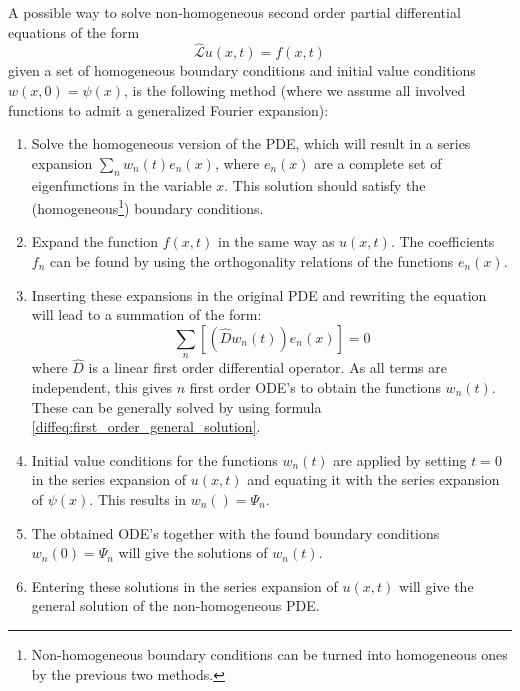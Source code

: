     \begin{method}
        A possible way to solve non-homogeneous second order partial differential equations of the form \[\hat{\mathcal{L}}u(x, t) = f(x, t)\] given a set of homogeneous boundary conditions and initial value conditions $w(x, 0) = \psi(x)$, is the following method (where we assume all involved functions to admit a generalized Fourier expansion):
        \begin{enumerate}
            \item Solve the homogeneous version of the PDE, which will result in a series expansion $\sum_nw_n(t)e_n(x)$, where $e_n(x)$ are a complete set of eigenfunctions in the variable $x$. This solution should satisfy the (homogeneous\footnote{Non-homogeneous boundary conditions can be turned into homogeneous ones by the previous two methods.}) boundary conditions.
            \item Expand the function $f(x, t)$ in the same way as $u(x, t)$. The coefficients $f_n$ can be found by using the orthogonality relations of the functions $e_n(x)$.
            \item Inserting these expansions in the original PDE and rewriting the equation will lead to a summation of the form: \[\sum_n\left[\left(\hat{D}w_n(t)\right)e_n(x)\right] = 0\] where $\hat{D}$ is a linear first order differential operator. As all terms are independent, this gives $n$ first order ODE's to obtain the functions $w_n(t)$. These can be generally solved by using formula \ref{diffeq:first_order_general_solution}.
            \item Initial value conditions for the functions $w_n(t)$ are applied by setting $t=0$ in the series expansion of $u(x, t)$ and equating it with the series expansion of $\psi(x)$. This results in $w_n() = \Psi_n$.
            \item The obtained ODE's together with the found boundary conditions $w_n(0) = \Psi_n$ will give the solutions of $w_n(t)$.
            \item Entering these solutions in the series expansion of $u(x, t)$ will give the general solution of the non-homogeneous PDE.
        \end{enumerate}
    \end{method}

